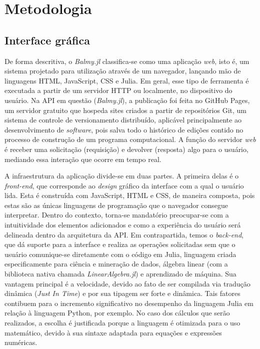 \chapter{Metodologia
}\label{cap:desenvolvimento}
\section{Interface gráfica}

De forma descritiva, o \textit{Balmy.jl} classifica-se como uma aplicação \textit{web}, isto é, um sistema projetado para utilização através de um navegador, lançando mão de linguagens \gls{HTML}, JavaScript, \gls{CSS} e Julia. Em geral, esse tipo de ferramenta é executada a partir de um servidor \gls{HTTP} ou localmente, no dispositivo do usuário. Na \gls{API} em questão (\textit{Balmy.jl}), a publicação foi feita no GitHub Pages, um servidor gratuito que hospeda sites criados a partir de repositórios Git, um sistema de controle de versionamento distribuído, aplicável principalmente ao desenvolvimento de \textit{software}, pois salva todo o histórico de edições contido no processo de construção de um programa computacional. A função do servidor \textit{web} é receber uma solicitação (requisição) e devolver (resposta) algo para o usuário, mediando essa interação que ocorre em tempo real. 

A infraestrutura da aplicação divide-se em duas partes. A primeira delas é o \textit{front-end}, que corresponde ao \textit{design} gráfico da interface com a qual o usuário lida. Esta é construída com JavaScript, \gls{HTML} e \gls{CSS}, de maneira composta, pois estas são as únicas linguagens de programação que o navegador consegue interpretar. Dentro do contexto, torna-se mandatório preocupar-se com a intuitividade dos elementos adicionados e como a experiência do usuário será delineada dentro da arquitetura da API. Em contrapartida, temos o \textit{back-end}, que dá suporte para a interface e realiza as operações solicitadas sem que o usuário comunique-se diretamente com o código em Julia, linguagem criada especificamente para ciência e mineração de dados, álgebra linear (com a biblioteca nativa chamada \textit{LinearAlgebra.jl}) e aprendizado de máquina. Sua vantagem principal é a velocidade, devido ao fato de ser compilada via tradução dinâmica (\textit{Just In Time}) e por sua tipagem ser forte e dinâmica. Tais fatores contibuem para o incremento significativo no desempenho da linguagem Julia em relação à linguagem Python, por exemplo. No caso dos cálculos que serão realizados, a escolha é justificada porque a linguagem é otimizada para o uso matemático, devido à sua sintaxe adaptada para equações
e expressões numéricas.

